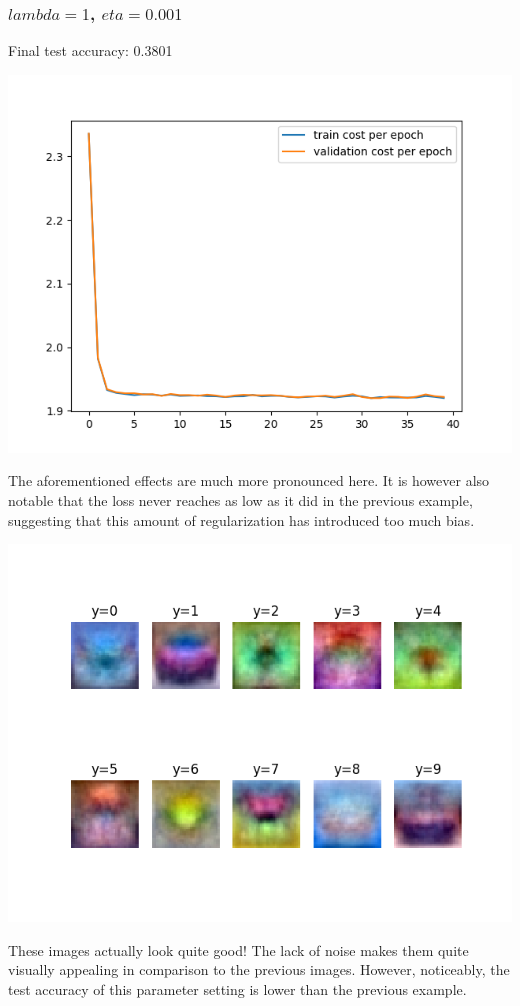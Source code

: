 \documentclass[11pt,a4paper]{article}
\begin{document}
\subsubsection{$lambda=1$, $eta=0.001$}
Final test accuracy: 0.3801

\includegraphics[width=\textwidth]{lambda_1.png}

The aforementioned effects are much more pronounced here. It is however also notable that the loss never reaches as low as it did in the previous example, suggesting that this amount of regularization has introduced too much bias.

\includegraphics[width=\textwidth]{lambda_1_montage.png}

These images actually look quite good! The lack of noise makes them quite visually appealing in comparison to the previous images. However, noticeably, the test accuracy of this parameter setting is lower than the previous example.
\end{document}
